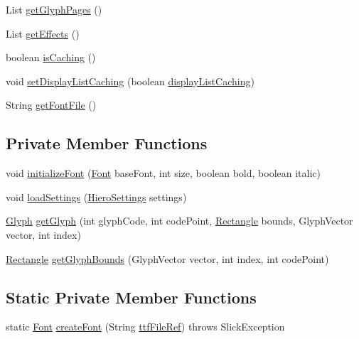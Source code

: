 \begin{DoxyCompactItemize}
List \mbox{\hyperlink{classorg_1_1newdawn_1_1slick_1_1_unicode_font_a04594e2bc110dd31237e54caea2cfb78}{get\+Glyph\+Pages}} ()
\item 
List \mbox{\hyperlink{classorg_1_1newdawn_1_1slick_1_1_unicode_font_a939775feafa7099e8631da5ef44ee28c}{get\+Effects}} ()
\item 
boolean \mbox{\hyperlink{classorg_1_1newdawn_1_1slick_1_1_unicode_font_a8b0c72ba9650c4535e0e9dd8ad4f1bd2}{is\+Caching}} ()
\item 
void \mbox{\hyperlink{classorg_1_1newdawn_1_1slick_1_1_unicode_font_a573d6193d464b5936b9846da9b2e28bd}{set\+Display\+List\+Caching}} (boolean \mbox{\hyperlink{classorg_1_1newdawn_1_1slick_1_1_unicode_font_aad1040617fd0167c54d6dd3511c6bd48}{display\+List\+Caching}})
\item 
String \mbox{\hyperlink{classorg_1_1newdawn_1_1slick_1_1_unicode_font_a569a6742eb931a0d9d21a14ca7a0d7c4}{get\+Font\+File}} ()
\end{DoxyCompactItemize}
\subsection*{Private Member Functions}
\begin{DoxyCompactItemize}
\item 
void \mbox{\hyperlink{classorg_1_1newdawn_1_1slick_1_1_unicode_font_a50d0619aea65cc8ebdc66a2d7c63aede}{initialize\+Font}} (\mbox{\hyperlink{interfaceorg_1_1newdawn_1_1slick_1_1_font}{Font}} base\+Font, int size, boolean bold, boolean italic)
\item 
void \mbox{\hyperlink{classorg_1_1newdawn_1_1slick_1_1_unicode_font_aa3d36e87e8bb263a354409ed1c1f761b}{load\+Settings}} (\mbox{\hyperlink{classorg_1_1newdawn_1_1slick_1_1font_1_1_hiero_settings}{Hiero\+Settings}} settings)
\item 
\mbox{\hyperlink{classorg_1_1newdawn_1_1slick_1_1font_1_1_glyph}{Glyph}} \mbox{\hyperlink{classorg_1_1newdawn_1_1slick_1_1_unicode_font_a30b90c7e39d5561f93cae92300ed5a22}{get\+Glyph}} (int glyph\+Code, int code\+Point, \mbox{\hyperlink{classorg_1_1newdawn_1_1slick_1_1geom_1_1_rectangle}{Rectangle}} bounds, Glyph\+Vector vector, int index)
\item 
\mbox{\hyperlink{classorg_1_1newdawn_1_1slick_1_1geom_1_1_rectangle}{Rectangle}} \mbox{\hyperlink{classorg_1_1newdawn_1_1slick_1_1_unicode_font_a61a42b9754ad2307b80a8699d484a158}{get\+Glyph\+Bounds}} (Glyph\+Vector vector, int index, int code\+Point)
\end{DoxyCompactItemize}
\subsection*{Static Private Member Functions}
\begin{DoxyCompactItemize}
\item 
static \mbox{\hyperlink{interfaceorg_1_1newdawn_1_1slick_1_1_font}{Font}} \mbox{\hyperlink{classorg_1_1newdawn_1_1slick_1_1_unicode_font_a1db149740542db5d183ef9307b0a45ff}{create\+Font}} (String \mbox{\hyperlink{classorg_1_1newdawn_1_1slick_1_1_unicode_font_a2f13dde71bdabcab77c49030a4af17f2}{ttf\+File\+Ref}})  throws Slick\+Exception 
\end{DoxyCompactItemize}
